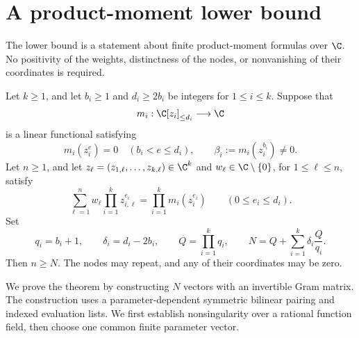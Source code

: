 \section{A product-moment lower bound}
\label{lb:section}

The lower bound is a statement about finite product-moment formulas over
\(\C\).  No positivity of the weights, distinctness of the nodes, or
nonvanishing of their coordinates is required.

\begin{theorem}
\label{thm:moment}
Let \(k\geq 1\), and let \(b_i\geq 1\) and \(d_i\geq 2b_i\) be
integers for \(1\leq i\leq k\).  Suppose that
\[
  m_i:\C[z_i]_{\leq d_i}\longrightarrow\C
\]
is a linear functional satisfying
\begin{equation}
  m_i(z_i^e)=0\quad(b_i<e\leq d_i),
  \qquad \beta_i:=m_i(z_i^{b_i})\neq 0.
  \label{lb:truncation}
\end{equation}
Let \(n\geq1\), and let \(z_\ell=(z_{1,\ell},\ldots,z_{k,\ell})\in\C^k\) and
\(w_\ell\in\C\setminus\{0\}\), for \(1\leq\ell\leq n\), satisfy
\begin{equation}
  \sum_{\ell=1}^{n}w_\ell\prod_{i=1}^{k}z_{i,\ell}^{e_i}
  =\prod_{i=1}^{k}m_i(z_i^{e_i})
  \qquad(0\leq e_i\leq d_i).
  \label{lb:moments}
\end{equation}
Set
\begin{equation}
  q_i=b_i+1,\qquad \delta_i=d_i-2b_i,\qquad
  Q=\prod_{i=1}^{k}q_i,\qquad
  N=Q+\sum_{i=1}^{k}\delta_i\frac{Q}{q_i}.
  \label{lb:parameters}
\end{equation}
Then \(n\geq N\).  The nodes may repeat, and any of their coordinates
may be zero.
\end{theorem}

We prove the theorem by constructing \(N\) vectors with an invertible
Gram matrix.  The construction uses a parameter-dependent symmetric
bilinear pairing and indexed evaluation lists.  We first establish
nonsingularity over a rational function field, then choose one common
finite parameter vector.

